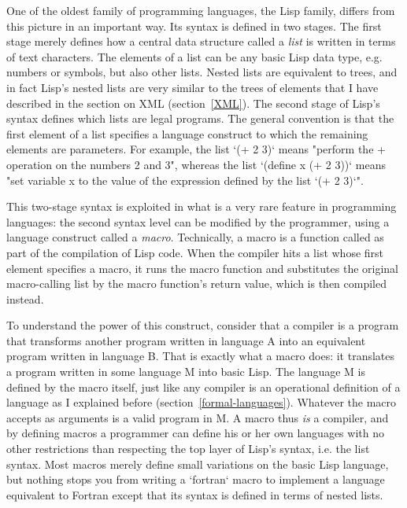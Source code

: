 One of the oldest family of programming languages, the Lisp family, differs from this picture in an important way. Its syntax is defined in two stages. The first stage merely defines how a central data structure called a \textit{list} is written in terms of text characters. The elements of a list can be any basic Lisp data type, e.g. numbers or symbols, but also other lists. Nested lists are equivalent to trees, and in fact Lisp's nested lists are very similar to the trees of elements that I have described in the section on XML (section~\ref{XML}). The second stage of Lisp's syntax defines which lists are legal programs. The general convention is that the first element of a list specifies a language construct to which the remaining elements are parameters. For example, the list `(+ 2 3)` means "perform the + operation on the numbers 2 and 3", whereas the list `(define x (+ 2 3))` means "set variable x to the value of the expression defined by the list `(+ 2 3)`".

This two-stage syntax is exploited in what is a very rare feature in programming languages: the second syntax level can be modified by the programmer, using a language construct called a \textit{macro}. Technically, a macro is a function called as part of the compilation of Lisp code. When the compiler hits a list whose first element specifies a macro, it runs the macro function and substitutes the original macro-calling list by the macro function's return value, which is then compiled instead.

To understand the power of this construct, consider that a compiler is a program that transforms another program written in language A into an equivalent program written in language B. That is exactly what a macro does: it translates a program written in some language M into basic Lisp. The language M is defined by the macro itself, just like any compiler is an operational definition of a language as I explained before (section~\ref{formal-languages}). Whatever the macro accepts as arguments is a valid program in M. A macro thus \textit{is} a compiler, and by defining macros a programmer can define his or her own languages with no other restrictions than respecting the top layer of Lisp's syntax, i.e. the list syntax. Most macros merely define small variations on the basic Lisp language, but nothing stops you from writing a `fortran` macro to implement a language equivalent to Fortran except that its syntax is defined in terms of nested lists.


